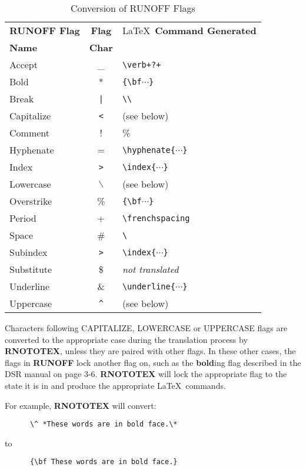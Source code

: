 \begin{table}[h]
\begin{center}
\begin{tabular}{lcl}
{\large\bf RUNOFF Flag } & {\large\bf Flag } & {\LaTeX\ \large\bf Command Generated} \\
{\large\bf Name        } & {\large\bf Char } &		\\ \hline
Accept			& \_		   & \verb!\verb+?+! \\
Bold			& *		   & \verb+{\bf+$\cdots$\verb+}+ \\
Break			& \verb+|+	   & \verb+\\+ \\
Capitalize		& \verb+<+	   & (see below) \\
Comment		        &  !		   & \% \\
Hyphenate		& =		   & \verb+\hyphenate{+$\cdots$\verb+}+ \\
Index			& \verb+>+	   & \verb+\index{+$\cdots$\verb+}+ \\
Lowercase		& $\backslash	$  & (see below) \\
Overstrike		& \%		   & \verb+{\bf+$\cdots$\verb+}+ \\
Period		        & +		   & \verb+\frenchspacing+ \\
Space			& \#		   & \verb*+\ + \\
Subindex		& \verb+>+         & \verb+\index{+$\cdots$\verb+}+ \\
Substitute		& \$		   & {\em not translated } \\
Underline		& \&		   & \verb+\underline{+$\cdots$\verb+}+ \\
Uppercase               & \verb+^+         & (see below) \\ \hline
\end{tabular}
\caption{Conversion of RUNOFF Flags\label{flag-commands}}
\end{center}
\end{table}

Characters following CAPITALIZE, LOWERCASE or UPPERCASE flags are converted
to the appropriate case during the translation process by {\bf RNOTOTEX},
unless they are paired with other flags.  In these other cases, the flags in
{\bf RUNOFF} lock another flag on, such as the {\bf bold}ing flag described
in the DSR manual\cite{dsr-manual} on page 3-6.  {\bf RNOTOTEX} will lock the
appropriate flag to the state it is in and produce the appropriate
\LaTeX\ commands.

For example, {\bf RNOTOTEX} will convert:
\begin{verbatim}
      \^ *These words are in bold face.\*
\end{verbatim}
to
\begin{verbatim}
      {\bf These words are in bold face.}
\end{verbatim}

